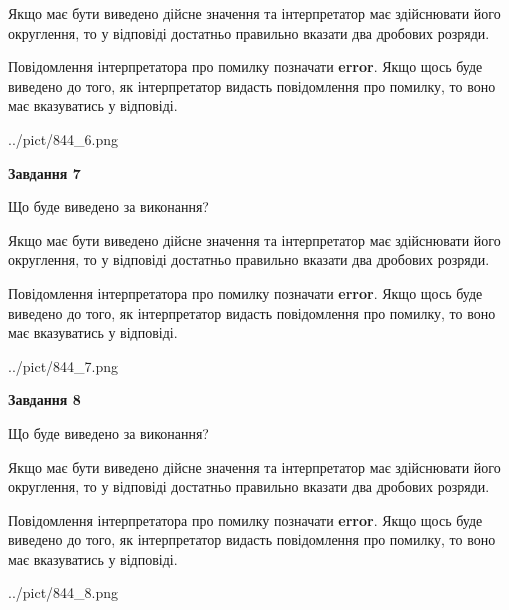\documentclass[12pt, ukrainian]{article}
\begin{document}
{\begin {Large}
Якщо має бути виведено дійсне значення та інтерпретатор має здійснювати його округлення, 
то у відповіді достатньо правильно вказати два дробових розряди.

Повідомлення інтерпретатора про помилку позначати \textbf{error}.
Якщо щось буде виведено до того, як інтерпретатор видасть повідомлення про помилку, 
то воно має вказуватись у відповіді. \par

\begin{center}
	{../pict/844_6.png}
\end{center}
\newpage

{\begin {center}\textbf{Завдання 7}\end {center}}\par
Що буде виведено за виконання? \par

Якщо має бути виведено дійсне значення та інтерпретатор має здійснювати його округлення, 
то у відповіді достатньо правильно вказати два дробових розряди.

Повідомлення інтерпретатора про помилку позначати \textbf{error}.
Якщо щось буде виведено до того, як інтерпретатор видасть повідомлення про помилку, 
то воно має вказуватись у відповіді. \par

\begin{center}
	{../pict/844_7.png}
\end{center}
\newpage

{\begin {center}\textbf{Завдання 8}\end {center}}\par
Що буде виведено за виконання? \par

Якщо має бути виведено дійсне значення та інтерпретатор має здійснювати його округлення, 
то у відповіді достатньо правильно вказати два дробових розряди.

Повідомлення інтерпретатора про помилку позначати \textbf{error}.
Якщо щось буде виведено до того, як інтерпретатор видасть повідомлення про помилку, 
то воно має вказуватись у відповіді. \par

\begin{center}
	{../pict/844_8.png}
\end{center}
\newpage


\end{Large}}
\end{document}
